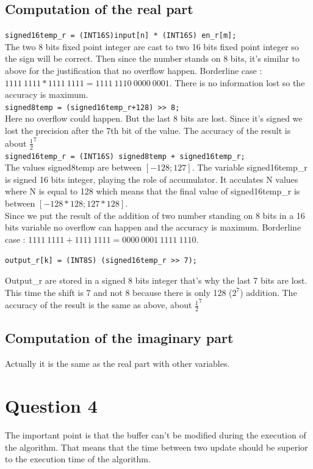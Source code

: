 \documentclass[a4paper]{article}
\begin{document}
\subsection{Computation of the real part}

\verb|signed16temp_r = (INT16S)input[n] * (INT16S) en_r[m];|
\\
The two 8 bits fixed point integer are cast to two 16 bits fixed point integer so the sign will be correct.
Then since the number stands on 8 bits, it's similar to above for the justification that no overflow happen. Borderline case :   $ 1111\ 1111 * 1111\ 1111 = 1111\ 1110\ 0000\ 0001 $. There is no information lost so the accuracy is maximum.
\\
\verb|signed8temp = (signed16temp_r+128) >> 8;|
\\
Here no overflow could happen. But the last 8 bits are lost.
Since it's signed we lost the precision after the 7th bit of the value.
The accuracy of the result is about $ \frac{1}{2} ^{7}$
\\
\verb|signed16temp_r = (INT16S) signed8temp + signed16temp_r;|
\\
The values signed8temp are between $[-128;127]$. The variable signed16temp\_r is signed 16 bits integer, playing the role of accumulator. It acculates N values where N is equal to 128 which means that the final value of signed16temp\_r is between $[-128*128;127*128]$.
\\
Since we put the result of the addition of two number standing on 8 bits in a 16 bits variable no overflow can happen and the accuracy is maximum. Borderline case : $ 1111\ 1111 + 1111\ 1111 = 0000\ 0001\ 1111\ 1110 $.

\verb|output_r[k] = (INT8S) (signed16temp_r >> 7);|

Output\_r are stored in a signed 8 bits integer that's why the last 7 bits are lost. This time the shift is 7 and not 8 because there is only 128 ($ 2^{7} $) addition.
The accuracy of the result is the same as above, about $ \frac{1}{2} ^{7} $

\subsection{Computation of the imaginary part}

Actually it is the same as the real part with other variables.

\section{Question 4}
The important point is that the buffer can't be modified during the execution of the algorithm. That means that the time between two update should be superior to the execution time of the algorithm.
\end{document}
